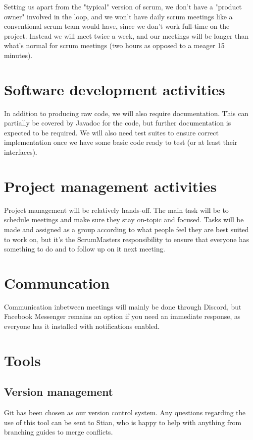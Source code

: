 \documentclass{article}
\begin{document}
Setting us apart from the "typical" version of scrum, we don't have a "product owner" involved in the loop, and we won't have daily scrum meetings like a conventional scrum team would have, since we don't work full-time on the project. Instead we will meet twice a week, and our meetings will be longer than what's normal for scrum meetings (two hours as opposed to a meager 15 minutes).

\section*{Software development activities}

In addition to producing raw code, we will also require documentation. This can partially be covered by Javadoc for the code, but further documentation is expected to be required. We will also need test suites to ensure correct implementation once we have some basic code ready to test (or at least their interfaces).

\section*{Project management activities}

Project management will be relatively hands-off. The main task will be to schedule meetings and make sure they stay on-topic and focused. Tasks will be made and assigned as a group according to what people feel they are best suited to work on, but it's the ScrumMasters responsibility to ensure that everyone has something to do and to follow up on it next meeting.

\section*{Communcation}

Communication inbetween meetings will mainly be done through Discord, but Facebook Messenger remains an option if you need an immediate response, as everyone has it installed with notifications enabled. 
\section*{Tools}

\subsection*{Version management}

Git has been chosen as our version control system. Any questions regarding the use of this tool can be sent to Stian, who is happy to help with anything from branching guides to merge conflicts.\\
\end{document}
